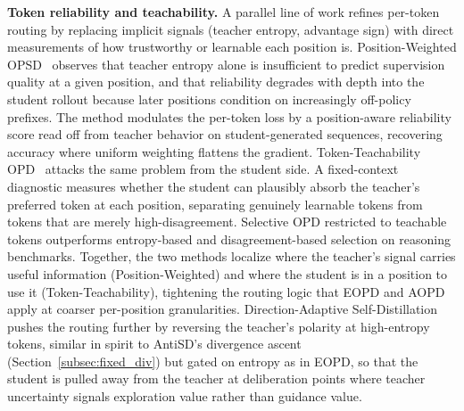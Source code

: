 \documentclass{article} %
\begin{document}
\textbf{Token reliability and teachability.} A parallel line of work refines per-token routing by replacing implicit signals (teacher entropy, advantage sign) with direct measurements of how trustworthy or learnable each position is. Position-Weighted OPSD~\citep{2605.21606} observes that teacher entropy alone is insufficient to predict supervision quality at a given position, and that reliability degrades with depth into the student rollout because later positions condition on increasingly off-policy prefixes. The method modulates the per-token loss by a position-aware reliability score read off from teacher behavior on student-generated sequences, recovering accuracy where uniform weighting flattens the gradient. Token-Teachability OPD~\citep{2605.26844} attacks the same problem from the student side. A fixed-context diagnostic measures whether the student can plausibly absorb the teacher's preferred token at each position, separating genuinely learnable tokens from tokens that are merely high-disagreement. Selective OPD restricted to teachable tokens outperforms entropy-based and disagreement-based selection on reasoning benchmarks. Together, the two methods localize where the teacher's signal carries useful information (Position-Weighted) and where the student is in a position to use it (Token-Teachability), tightening the routing logic that EOPD and AOPD apply at coarser per-position granularities. Direction-Adaptive Self-Distillation~\citep{2605.22263} pushes the routing further by reversing the teacher's polarity at high-entropy tokens, similar in spirit to AntiSD's divergence ascent (Section~\ref{subsec:fixed_div}) but gated on entropy as in EOPD, so that the student is pulled away from the teacher at deliberation points where teacher uncertainty signals exploration value rather than guidance value.
\end{document}
